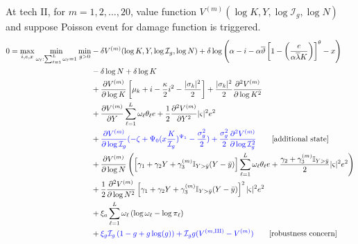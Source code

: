 \documentclass[11pt]{article}
\begin{document}
	 At tech II, for $m = 1,2,\dots, 20$, value function $V^{(m)} (\log K, Y, \log \mathcal{I}_g, \log N)$ and suppose Poisson event for damage function is triggered.
	\begin{align*} 
		0 = \max_{i,e,x} \min_{\omega_\ell:\sum_{\ell = 1}^L \omega_\ell = 1 }\min_{g >0} &   - \delta V^{(m)}(\log K,Y,\log \mathcal{I}_g, \log N) +  \delta \log \left( \alpha - i -  \alpha \overline{\vartheta} \left[ 1 - \left(\frac {e} { \alpha \overline\lambda K} \right) \right]^\theta -x\right)\\
		& - \delta \log N + \delta\log K \cr 
		& + \frac {\partial V^{(m)}}{\partial \log K} 
		\left[ \mu_k    + i   -
		{\frac { \kappa} 2} i^2  -  \frac  {|\sigma_k|^2}  2\right]  + \frac {|\sigma_k|^2} 2  \frac {\partial^2 V^{(m)}}{\partial \log K^2} \cr
		& + \frac {\partial  V^{(m)}}{\partial Y}  \sum_{\ell=1}^L \omega_\ell  \theta_\ell {e} + {\frac 1 2} \frac {\partial^2 V^{(m)}}{\partial Y^2} |\varsigma|^2 e^2  \cr
		& +\textcolor{blue}{ \frac{\partial V^{(m)}}{\partial \log \mathcal{I}_g} (- \zeta + \Psi_0 (x\frac{K}{\mathcal{I}_g})^{\Psi_1} - \frac{\sigma_g^2}{2} ) + \frac{\sigma_g^2}{2}\frac{\partial^2 V^{(m)}}{\partial \log \mathcal{I}_g^2}} \tag*{[additional state]}\\
		& + \frac{\partial V^{(m)}}{\partial \log N} \left( \left[ \gamma_1 + \gamma_2 Y + \gamma_3^{(m)} \mathbb{I}_{Y > \bar{y}} (Y - \bar{y})\right]   \sum_{\ell=1}^L \omega_\ell \theta_\ell {e} + \frac{\gamma_2 + \gamma_3^{(m)}\mathbb{I}_{Y>\bar{y}}}{2} |\varsigma|^2  e^2 \right) \cr
		& + \frac{1}{2}\frac{\partial^2 V^{(m)}}{\partial \log N^2} \left[ \gamma_1 + \gamma_2 Y + \gamma_3^{(m)} \mathbb{I}_{Y > \bar{y}} (Y - \bar{y})\right]^2 |\varsigma|^2 e^2 \cr
		& + \xi_a \sum_{\ell = 1}^L \omega_\ell \left( \log \omega_\ell - \log \pi_\ell \right)\\
		& +\textcolor{blue}{ \xi_g \mathcal{I}_g \left(1 - g + g  \log(g) \right) + \mathcal{I}_g g (V^{(m, \text{III})} - V^{(m)} )} \tag*{[robustness concern]}
	\end{align*} 
	
\end{document}
